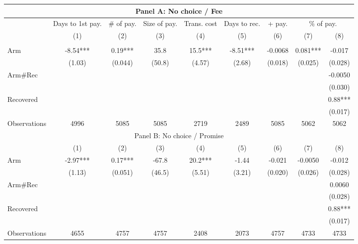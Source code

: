 \begin{tabular}{lcccccccc}
\toprule
\multicolumn{9}{c}{Panel A: No choice / Fee} \\
\midrule
\midrule
      & Days to 1st pay. & \# of pay. & Size of pay. & Trans. cost & Days to rec. & + pay. & \multicolumn{2}{c}{\% of pay.} \\
\midrule
      & (1)   & (2)   & (3)   & (4)   & (5)   & (6)   & (7)   & (8) \\
\midrule
\midrule
      &       &       &       &       &       &       &       &  \\
Arm   & -8.54*** & 0.19*** & 35.8  & 15.5*** & -8.51*** & -0.0068 & 0.081*** & -0.017 \\
      & (1.03) & (0.044) & (50.8) & (4.57) & (2.68) & (0.018) & (0.025) & (0.028) \\
Arm\#Rec &       &       &       &       &       &       &       & -0.0050 \\
      &       &       &       &       &       &       &       & (0.030) \\
Recovered &       &       &       &       &       &       &       & 0.88*** \\
      &       &       &       &       &       &       &       & (0.017) \\
\midrule
Observations & 4996  & 5085  & 5085  & 2719  & 2489  & 5085  & 5062  & 5062 \\
\midrule
\multicolumn{9}{c}{Panel B: No choice / Promise} \\
\midrule
\midrule
      & (1)   & (2)   & (3)   & (4)   & (5)   & (6)   & (7)   & (8) \\
\midrule
\midrule
Arm   & -2.97*** & 0.17*** & -67.8 & 20.2*** & -1.44 & -0.021 & -0.0050 & -0.012 \\
      & (1.13) & (0.051) & (46.5) & (5.51) & (3.21) & (0.020) & (0.026) & (0.028) \\
Arm\#Rec &       &       &       &       &       &       &       & 0.0060 \\
      &       &       &       &       &       &       &       & (0.028) \\
Recovered &       &       &       &       &       &       &       & 0.88*** \\
      &       &       &       &       &       &       &       & (0.017) \\
\midrule
Observations & 4655  & 4757  & 4757  & 2408  & 2073  & 4757  & 4733  & 4733 \\
\midrule

\end{tabular}
